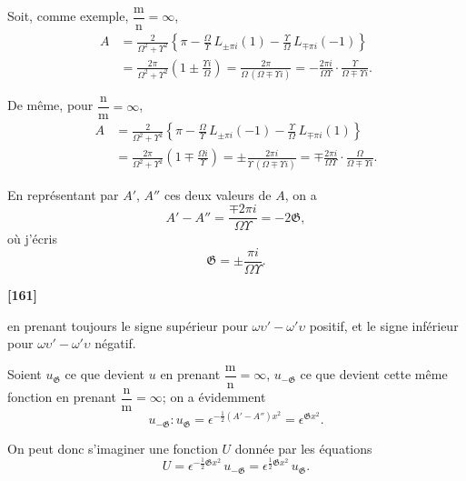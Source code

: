\documentclass[11pt,a4paper]{article}
\begin{document}
Soit, comme exemple, $\dfrac{\mathrm{m}}{\mathrm{n}} = \infty$,
\begin{align*}
A &= \frac{2}{\Omega^2 + \Upsilon^2} \left\{\pi - \frac{\Omega}{\Upsilon}\, L_{\pm\pi i}(1) - \frac{\Upsilon}{\Omega}\, L_{\mp\pi i}(-1)\right\}\\
&= \frac{2\pi}{\Omega^2 + \Upsilon^2} \left(1 \pm \frac{\Upsilon i}{\Omega}\right)
= \frac{2\pi}{\Omega\, (\Omega \mp \Upsilon i)}
= -\frac{2\pi i}{\Omega\Upsilon} \cdot \frac{\Upsilon}{\Omega \mp \Upsilon i}.
\end{align*}

De m\^eme, pour $\dfrac{\mathrm{n}}{\mathrm{m}} = \infty$,
\begin{align*}
A &= \frac{2}{\Omega^2 + \Upsilon^2} \left\{\pi - \frac{\Omega}{\Upsilon}\, L_{\pm\pi i}(-1) - \frac{\Upsilon}{\Omega}\, L_{\mp\pi i}(1)\right\}\\
&= \frac{2\pi}{\Omega^2 + \Upsilon^2} \left(1 \mp \frac{\Omega i}{\Upsilon}\right)
= \pm \frac{2\pi i}{\Upsilon\, (\Omega \mp \Upsilon i)}
= \mp \frac{2\pi i}{\Omega\Upsilon} \cdot \frac{\Omega}{\Omega \mp \Upsilon i}.
\end{align*}

En repr\'esentant par $A'$, $A''$ ces deux valeurs de $A$, on a
\begin{equation}
A' - A'' = \frac{\mp 2\pi i}{\Omega\Upsilon} = -2\mathfrak{G}, \tag{10}
\end{equation}
o\`u j'\'ecris
\begin{equation}
\mathfrak{G} = \pm \frac{\pi i}{\Omega\Upsilon}. \tag{11}
\end{equation}

\textbf{[161]}

en prenant toujours le signe sup\'erieur pour $\omega\upsilon' - \omega'\upsilon$ positif, et le signe inf\'erieur pour
$\omega\upsilon' - \omega'\upsilon$ n\'egatif.

Soient $u_{\mathfrak{G}}$ ce que devient $u$ en prenant $\dfrac{\mathrm{m}}{\mathrm{n}} = \infty$, $u_{-\mathfrak{G}}$ ce que devient cette m\^eme
fonction en prenant $\dfrac{\mathrm{n}}{\mathrm{m}} = \infty$; on a \'evidemment
\[u_{-\mathfrak{G}} : u_{\mathfrak{G}} = \epsilon^{-\frac{1}{2}(A' - A'')x^2} = \epsilon^{\mathfrak{G}x^2}.\]

On peut donc s'imaginer une fonction $U$ donn\'ee par les \'equations
\begin{equation}
U = \epsilon^{-\frac{1}{2}\mathfrak{G}x^2}\, u_{-\mathfrak{G}} = \epsilon^{\frac{1}{2}\mathfrak{G}x^2}\, u_{\mathfrak{G}}. \tag{12}
\end{equation}
\end{document}
